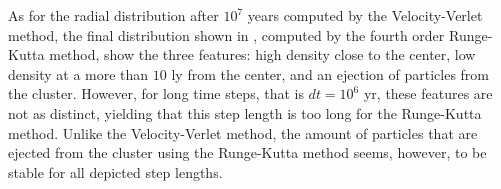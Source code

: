 As for the radial distribution after $10^7$ years computed by the Velocity-Verlet method, the final distribution shown in , computed by the fourth order Runge-Kutta method, show the three features: high density close to the center, low density at a more than $10$ ly from the center, and an ejection of particles from the cluster.
However, for long time steps, that is $dt = 10^6$ yr, these features are not as distinct, yielding that this step length is too long for the Runge-Kutta method. 
Unlike the Velocity-Verlet method, the amount of particles that are ejected from the cluster using the Runge-Kutta method seems, however, to be stable for all depicted step lengths. 